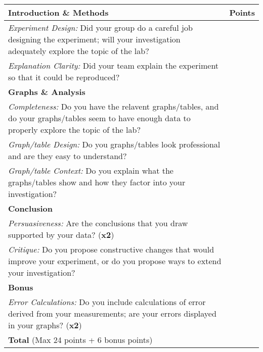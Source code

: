 \begin{table}[h]
	\centering
	\begin{tabular}{|p{13cm}|c|}
	\hline
	\textbf{Introduction \& Methods} & \textbf{Points} \\
	\hline
	\emph{Experiment Design:} Did your group do a careful job designing the experiment; will your investigation adequately explore the topic of the lab? &  \\
	\hline
	\emph{Explanation Clarity:} Did your team explain the experiment so that it could be reproduced? &  \\
	\hline
	\textbf{Graphs \& Analysis} &  \\
	\hline
	\emph{Completeness:} Do you have the relavent graphs/tables, and do your graphs/tables seem to have enough data to properly explore the topic of the lab?  &  \\
	\hline
	\emph{Graph/table Design:} Do you graphs/tables look professional and are they easy to understand? &  \\
	\hline
	\emph{Graph/table Context:} Do you explain what the graphs/tables show and how they factor into your investigation? &  \\
	\hline
	\textbf{Conclusion} &  \\
	\hline
	\emph{Persuasiveness:} Are the conclusions that you draw supported by your data? (\textbf{x2}) &  \\
	\hline
	\emph{Critique:} Do you propose constructive changes that would improve your experiment, or do you propose ways to extend your investigation? &  \\
	\hline
	\textbf{Bonus} &  \\
	\hline
	\emph{Error Calculations:} Do you include calculations of error derived from your measurements; are your errors displayed in your graphs? (\textbf{x2}) &  \\
	\hline
	\textbf{Total} (Max 24 points + 6 bonus points) &  \\
	\hline
	\end{tabular}
\end{table}

\newpage

